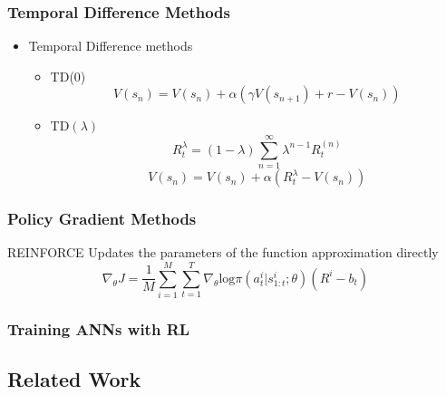 \subsubsection{Temporal Difference Methods}
\begin{itemize}

\item Temporal Difference methods

\begin{itemize}
\item TD(0)
\begin{equation*}
V(s_n) = V(s_n) + \alpha ( \gamma V(s_{n+1}) + r - V(s_n) )
\end{equation*}
\item TD$(\lambda)$
\begin{equation*}
R_t^\lambda = (1 - \lambda) \sum_{n = 1}^\infty \lambda^{n-1} R_t^{(n)}
\end{equation*}
\begin{equation*}
V(s_n) = V(s_n) + \alpha ( R_t^\lambda - V(s_n) )
\end{equation*}

\end{itemize}
\end{itemize}


\subsubsection{Policy Gradient Methods}
REINFORCE
Updates the parameters of the function approximation directly
\begin{equation*}
\nabla_\theta J = \frac{1}{M}\sum_{i=1}^M\sum_{t=1}^T\nabla_\theta  \text{log}\pi (a_t^i | s_{1:t}^i ; \theta)(R^i - b_t)
\label{eq:1}
\end{equation*}

\subsubsection{Training ANNs with RL}


\subsection{Related Work}




